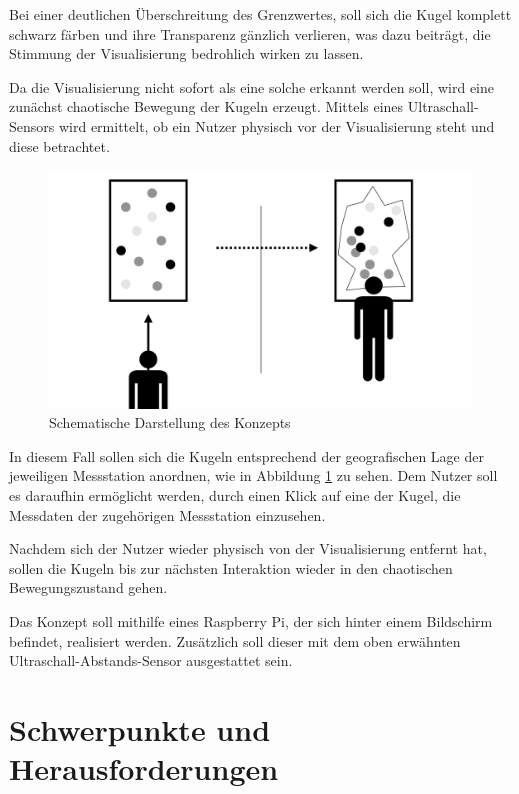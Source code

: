 \documentclass[12pt]{article} %
\begin{document}
Bei einer deutlichen Überschreitung des Grenzwertes, soll sich die Kugel komplett schwarz färben und ihre Transparenz gänzlich verlieren, was dazu beiträgt, die Stimmung der Visualisierung bedrohlich wirken zu lassen.

Da die Visualisierung nicht sofort als eine solche erkannt werden soll, wird eine zunächst chaotische Bewegung der Kugeln erzeugt.
Mittels eines Ultraschall-Sensors wird ermittelt, ob ein Nutzer physisch vor der Visualisierung steht und diese betrachtet.

\begin{figure}
	\centering
	\includegraphics[scale=0.1]{assets/Diagram.pdf}
  \caption{Schematische Darstellung des Konzepts}
	\label{pdf:diagram}
\end{figure}

In diesem Fall sollen sich die Kugeln entsprechend der geografischen Lage der jeweiligen Messstation anordnen, wie in Abbildung \ref{pdf:diagram} zu sehen.
Dem Nutzer soll es daraufhin ermöglicht werden, durch einen Klick auf eine der Kugel, die Messdaten der zugehörigen Messstation einzusehen.

Nachdem sich der Nutzer wieder physisch von der Visualisierung entfernt hat, sollen die Kugeln bis zur nächsten Interaktion wieder in den chaotischen Bewegungszustand gehen.  

Das Konzept soll mithilfe eines Raspberry Pi, der sich hinter einem Bildschirm befindet, realisiert werden.
Zusätzlich soll dieser mit dem oben erwähnten Ultraschall-Abstands-Sensor ausgestattet sein. 


\section{Schwerpunkte und Herausforderungen} \label{sec:Schwerpunkte}
\end{document}
